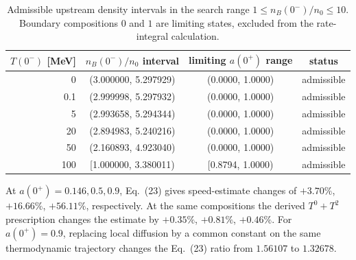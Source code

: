 \begin{table}[tbp]
\centering
\caption{Admissible upstream density intervals in the search range \(1\le n_B(0^-)/n_0\le10\).
Boundary compositions \(0\) and \(1\) are limiting states, excluded from the rate-integral calculation.}
\label{tab:adiabatic-intervals}
\begin{tabular}{rccc}
\toprule
\(T(0^-)\) [MeV] & \(n_B(0^-)/n_0\) interval & limiting \(a(0^+)\) range & status\\
\midrule
0 & (3.000000, 5.297929) & (0.0000, 1.0000) & admissible \\
0.1 & (2.999998, 5.297932) & (0.0000, 1.0000) & admissible \\
5 & (2.993658, 5.294344) & (0.0000, 1.0000) & admissible \\
20 & (2.894983, 5.240216) & (0.0000, 1.0000) & admissible \\
50 & (2.160893, 4.923040) & (0.0000, 1.0000) & admissible \\
100 & [1.000000, 3.380011) & [0.8794, 1.0000) & admissible \\
\bottomrule
\end{tabular}
\end{table}
At \(a(0^+)=0.146,0.5,0.9\), Eq.~(23) gives speed-estimate changes of \(+3.70\%\), \(+16.66\%\), \(+56.11\%\), respectively.
At the same compositions the derived \(T^0+T^2\) prescription changes the estimate by \(+0.35\%\), \(+0.81\%\), \(+0.46\%\).
For \(a(0^+)=0.9\), replacing local diffusion by a common constant on the same thermodynamic trajectory changes the Eq.~(23) ratio from \(1.56107\) to \(1.32678\).
